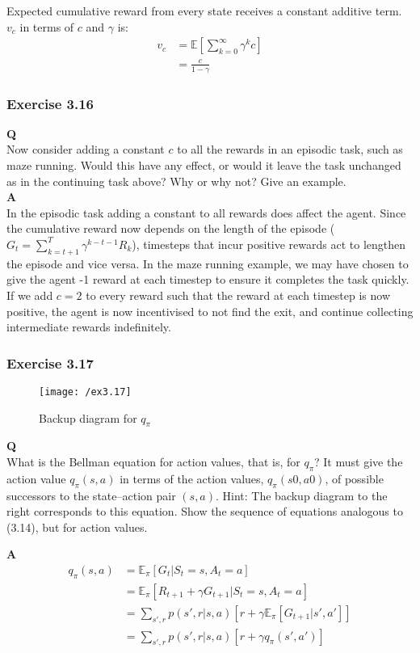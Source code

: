 Expected cumulative reward from every state receives a constant additive term. \(v_c\) in terms of $c$ and $\gamma$ is:
\begin{align}
v_c &= \mathbb{E}\left[\sum_{k=0}^{\infty}\gamma^k c\right]\\
&= \frac{c}{1 - \gamma}
\end{align}

\subsubsection{Exercise 3.16}
\textbf{Q}\\
Now consider adding a constant $c$ to all the rewards in an episodic task, such as maze running. Would this have any effect, or would it leave the task unchanged as in the continuing task above? Why or why not? Give an example. \\

\textbf{A}\\
In the episodic task adding a constant to all rewards does affect the agent. Since the cumulative reward now depends on the length of the episode ($G_t = \sum_{k=t+1}^{T} \gamma^{k-t-1}R_k $), timesteps that incur positive rewards act to lengthen the episode and vice versa. In the maze running example, we may have chosen to give the agent -1 reward at each timestep to ensure it completes the task quickly. If we add $c=2$ to every reward such that the reward at each timestep is now positive, the agent is now incentivised to not find the exit, and continue collecting intermediate rewards indefinitely. 

\subsubsection{Exercise 3.17}
\begin{figure}[h!]
	\centering
	\texttt{[image: /ex3.17]}
	\caption{Backup diagram for $q_\pi$}
	\label{fig:3.17}
\end{figure}
\textbf{Q}\\
What is the Bellman equation for action values, that is, for $q_\pi$? It must give the action value $q_\pi(s, a)$ in terms of the action values, $q_\pi(s0, a0)$, of possible successors to the state–action pair $(s, a)$. Hint: The backup diagram to the right corresponds to this equation. Show the sequence of equations analogous to (3.14), but for action values.

\textbf{A}\\
\begin{align}
q_\pi(s,a) &= \mathbb{E}_\pi[G_t | S_t = s, A_t = a] \\
&= \mathbb{E}_\pi[R_{t+1} + \gamma G_{t+1} | S_t = s, A_t = a] \\
&= \sum_{s', r} p(s', r | s, a) [r + \gamma \mathbb{E}_\pi[G_{t+1} | s', a']] \\
&= \sum_{s', r} p(s', r | s, a) [r + \gamma q_\pi(s', a')] \\
\end{align}

